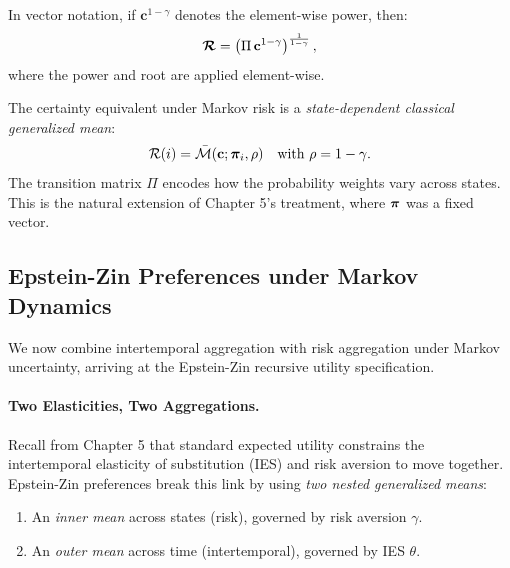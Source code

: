 In vector notation, if $\mathbf{c}^{1-\gamma}$ denotes the element-wise power, then:
\begin{equation}
\boldsymbol{\mathcal{R}} = \left( \Pi \, \mathbf{c}^{1-\gamma} \right)^{\frac{1}{1-\gamma}},
\label{eq:ce-vector}
\end{equation}
where the power and root are applied element-wise.

\begin{calloutimportant}
The certainty equivalent under Markov risk is a \emph{state-dependent classical generalized mean}:
\begin{equation}
\mathcal{R}(i) = \bar{\mathcal{M}}(\mathbf{c}; \bm{\pi}_i, \rho) \quad \text{with } \rho = 1 - \gamma.
\end{equation}
The transition matrix $\Pi$ encodes how the probability weights vary across states. This is the natural extension of Chapter 5's treatment, where $\bm{\pi}$ was a fixed vector.
\end{calloutimportant}

\subsection{Epstein-Zin Preferences under Markov Dynamics}
\label{subsec:epstein-zin-markov}

We now combine intertemporal aggregation with risk aggregation under Markov uncertainty, arriving at the Epstein-Zin recursive utility specification.

\paragraph{Two Elasticities, Two Aggregations.}
Recall from Chapter 5 that standard expected utility constrains the intertemporal elasticity of substitution (IES) and risk aversion to move together. Epstein-Zin preferences break this link by using \emph{two nested generalized means}:
\begin{enumerate}[label=(\roman*)]
\item An \emph{inner mean} across states (risk), governed by risk aversion $\gamma$.
\item An \emph{outer mean} across time (intertemporal), governed by IES $\theta$.
\end{enumerate}

